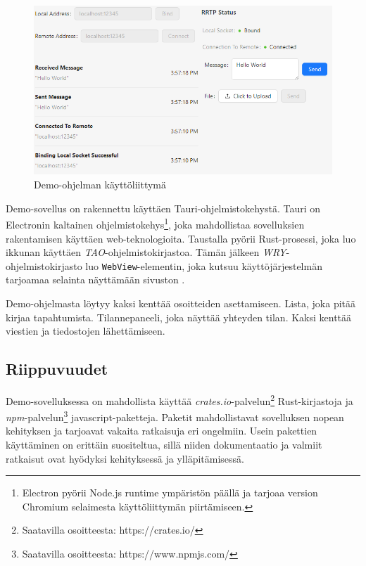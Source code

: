 \documentclass[a4paper,12pt]{article}
\begin{document}
    \begin{figure}[h!]
        \centering
        \includegraphics[width=\textwidth]{doc/latex/src/images/RRTP.png}
        \caption{Demo-ohjelman käyttöliittymä}
        \label{fig:demo_interface}
    \end{figure}

    Demo-sovellus on rakennettu käyttäen Tauri-ohjelmistokehystä.
    Tauri on Electronin kaltainen ohjelmistokehys\footnote{Electron pyörii Node.js runtime ympäristön päällä ja tarjoaa version Chromium selaimesta käyttöliittymän piirtämiseen.}, joka mahdollistaa sovelluksien rakentamisen käyttäen web-teknologioita. Taustalla pyörii Rust-prosessi, joka luo ikkunan käyttäen \textit{TAO}-ohjelmistokirjastoa. Tämän jälkeen \textit{WRY}-ohjelmistokirjasto luo \lstinline{WebView}-elementin, joka kutsuu käyttöjärjestelmän tarjoamaa selainta näyttämään sivuston \cite{tauri-app}.

    Demo-ohjelmasta löytyy kaksi kenttää osoitteiden asettamiseen. Lista, joka
    pitää kirjaa tapahtumista. Tilannepaneeli, joka näyttää yhteyden tilan.
    Kaksi kenttää viestien ja tiedostojen lähettämiseen. \par

    \subsection{Riippuvuudet}
    Demo-sovelluksessa on mahdollista käyttää \textit{crates.io}-palvelun\footnote{Saatavilla osoitteesta: https://crates.io/} Rust-kirjastoja ja \textit{npm}-palvelun\footnote{Saatavilla osoitteesta: https://www.npmjs.com/} javascript-paketteja. Paketit mahdollistavat sovelluksen nopean kehityksen ja tarjoavat vakaita ratkaisuja eri ongelmiin. Usein pakettien käyttäminen on erittäin suositeltua, sillä niiden dokumentaatio ja valmiit ratkaisut ovat hyödyksi kehityksessä ja ylläpitämisessä.
\end{document}
